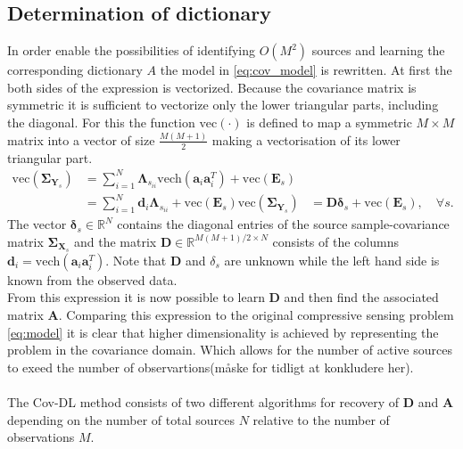 \subsection{Determination of dictionary}
In order enable the possibilities of identifying $O(M^2)$ sources and learning the corresponding dictionary $A$ the model in \eqref{eq:cov_model} is rewritten.  
At first the both sides of the expression is vectorized. Because the covariance matrix is symmetric it is sufficient to vectorize only the lower triangular parts, including the diagonal. For this the function $\text{vec}(\cdot)$ is defined to map a symmetric $M\times M$ matrix into a vector of size $\frac{M(M+1)}{2}$ making a vectorisation of its lower triangular part.     
\begin{align*}
\text{vec}(\boldsymbol{\Sigma}_{\mathbf{Y}_s}) &= \sum_{i=1}^N \boldsymbol{\Lambda}_{s_{ii}} \text{vech}(\mathbf{a}_i \mathbf{a}_i^T) + \text{vec}(\mathbf{E}_s) \\
&= \sum_{i=1}^N \textbf{d}_i \boldsymbol{\Lambda}_{s_{ii}} + \text{vec}(\mathbf{E}_s)
\text{vec}(\boldsymbol{\Sigma}_{\mathbf{Y}_s}) &= \mathbf{D} \boldsymbol{\delta}_s + \text{vec}(\mathbf{E}_s), \quad \forall s.
\end{align*}
The vector $\boldsymbol{\delta}_s \in \mathbb{R}^{N}$ contains the diagonal entries of the source sample-covariance matrix $\boldsymbol{\Sigma}_{\mathbf{X}_s}$
and the matrix $\mathbf{D} \in \mathbb{R}^{M(M+1)/2 \times N}$ consists of the columns $\mathbf{d}_i = \text{vech}(\mathbf{a}_i \mathbf{a}_i^T)$. Note that $\textbf{D}$ and $\delta_s$ are unknown while the left hand side is known from the observed data.
\\
From this expression it is now possible to learn $\mathbf{D}$ and then find the associated matrix $\mathbf{A}$.
Comparing this expression to the original compressive sensing problem \eqref{eq:model} it is clear that higher dimensionality is   achieved by representing the problem in the covariance domain. Which allows for the number of active sources to exeed the number of observartions(måske for tidligt at konkludere her).\\
\\
The Cov-DL method consists of two different algorithms for  recovery of $\textbf{D}$ and $\textbf{A}$ depending on the number of total sources $N$ relative to the number of observations $M$. 

